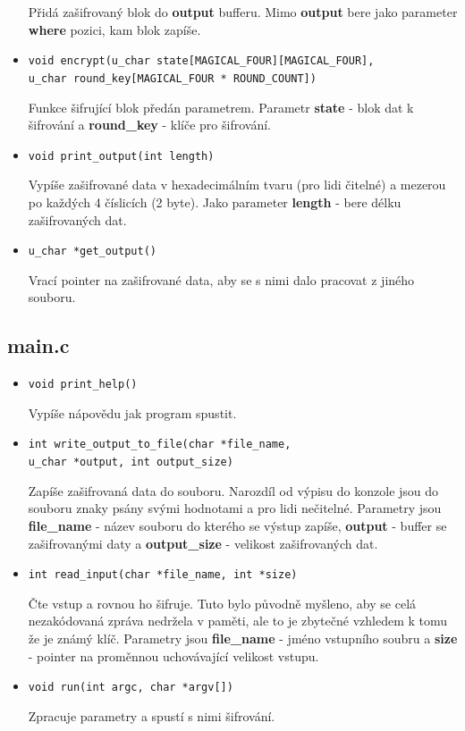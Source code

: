 \documentclass[12pt]{article}
\begin{document}
\begin{itemize}
		Přidá zašifrovaný blok do \textbf{output} bufferu. Mimo
		\textbf{output} bere jako parameter \textbf{where} pozici,
		kam blok zapíše.
	\item \texttt{void encrypt(u\_char state[MAGICAL\_FOUR][MAGICAL\_FOUR],\\
		u\_char round\_key[MAGICAL\_FOUR * ROUND\_COUNT])}

		Funkce šifrující blok předán parametrem. Parametr
		\textbf{state} - blok dat k šifrování a \textbf{round\_key} -
		klíče pro šifrování.
	\item \texttt{void print\_output(int length)}

		Vypíše zašifrované data v hexadecimálním tvaru (pro lidi čitelné) a mezerou po
		každých 4 číslicích (2 byte). Jako parameter \textbf{length} -
		bere délku zašifrovaných dat.
	\item \texttt{u\_char *get\_output()}

		Vrací pointer na zašifrované data, aby se s nimi dalo pracovat
		z jiného souboru.
\end{itemize}
\subsection{main.c}
\begin{itemize}
	\item \texttt{void print\_help()}

		Vypíše nápovědu jak program spustit.
	\item \texttt{int write\_output\_to\_file(char *file\_name,\\
		u\_char *output, int output\_size)}

		Zapíše zašifrovaná data do souboru. Narozdíl od výpisu do
		konzole jsou do souboru znaky psány svými hodnotami a pro
		lidi nečitelné. Parametry jsou \textbf{file\_name} - název 
		souboru do kterého se výstup zapíše, \textbf{output} - buffer 
		se zašifrovanými daty a \textbf{output\_size} - velikost
		zašifrovaných dat.
	\item \texttt{int read\_input(char *file\_name, int *size)}

		Čte vstup a rovnou ho šifruje. Tuto bylo původně myšleno, aby
		se celá nezakódovaná zpráva nedržela v paměti, ale to je 
		zbytečné vzhledem k tomu že je známý klíč. Parametry jsou
		\textbf{file\_name} - jméno vstupního soubru a \textbf{size} -
		pointer na proměnnou uchovávající velikost vstupu.
	\item \texttt{void run(int argc, char *argv[])}
		
		Zpracuje parametry a spustí s nimi šifrování.
\end{itemize}
%
%
\end{document}
